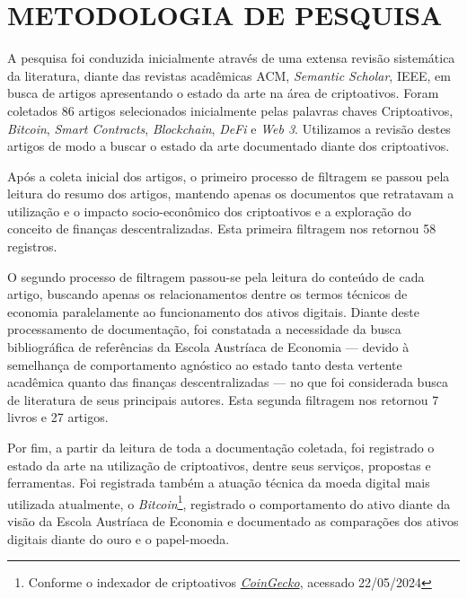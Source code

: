 \section*{METODOLOGIA DE PESQUISA}
A pesquisa foi conduzida inicialmente através de uma extensa revisão sistemática da literatura, diante das revistas acadêmicas ACM, \textit{Semantic Scholar}, IEEE, em busca de artigos apresentando o estado da arte na área de criptoativos. Foram coletados 86 artigos selecionados inicialmente pelas palavras chaves Criptoativos, \textit{Bitcoin}, \textit{Smart Contracts}, \textit{Blockchain}, \textit{DeFi} e \textit{Web 3}. Utilizamos a revisão destes artigos de modo a buscar o estado da arte documentado diante dos criptoativos.

Após a coleta inicial dos artigos, o primeiro processo de filtragem se passou pela leitura do resumo dos artigos, mantendo apenas os documentos que retratavam a utilização e o impacto socio-econômico dos criptoativos e a exploração do conceito de finanças descentralizadas. Esta primeira filtragem nos retornou 58 registros. 

O segundo processo de filtragem passou-se pela leitura do conteúdo de cada artigo, buscando apenas os relacionamentos dentre os termos técnicos de economia paralelamente ao funcionamento dos ativos digitais. Diante deste processamento de documentação, foi constatada a necessidade da busca bibliográfica de referências da Escola Austríaca de Economia — devido à semelhança de comportamento agnóstico ao estado tanto desta vertente acadêmica quanto das finanças descentralizadas — no que foi considerada busca de literatura de seus principais autores. Esta segunda filtragem nos retornou 7 livros e 27 artigos.

Por fim, a partir da leitura de toda a documentação coletada, foi registrado o estado da arte na utilização de criptoativos, dentre seus serviços, propostas e ferramentas. Foi registrada também a atuação técnica da moeda digital mais utilizada atualmente, o \textit{Bitcoin}\footnote{Conforme o indexador de criptoativos \href{https://www.coingecko.com/pt}{\textit{CoinGecko}}, acessado 22/05/2024}, registrado o comportamento do ativo diante da visão da Escola Austríaca de Economia e documentado as comparações dos ativos digitais diante do ouro e o papel-moeda.









